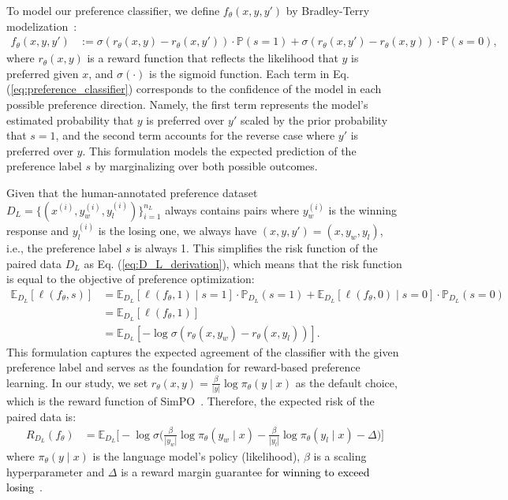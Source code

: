 \documentclass{article} %
\newcommand\fix[1]{\textcolor{black}{#1}}
\begin{document}
To model our preference classifier, we define $f_\theta(x, y, y')$ by Bradley-Terry modelization~\citep{bradley1952rank,rafailov2024direct,meng2024simposimplepreferenceoptimization}:
\begin{align}
\label{eq:preference_classifier}
    f_\theta(x, y, y') &:= \sigma(r_\theta(x, y) - r_\theta(x, y')) \cdot \mathbb{P}(s = 1) + \sigma(r_\theta(x, y') - r_\theta(x, y)) \cdot \mathbb{P}(s = 0),
\end{align}
where $r_\theta(x,y)$ is a reward function that reflects the likelihood that $y$ is preferred given $x$, and $\sigma(\cdot)$ is the sigmoid function. Each term in Eq. (\ref{eq:preference_classifier}) corresponds to the confidence of the model in each possible preference direction. Namely, the first term represents the model's estimated probability that $y$ is preferred over $y'$ scaled by the prior probability that $s = 1$, and the second term accounts for the reverse case where $y'$ is preferred over $y$. This formulation models the expected prediction of the preference label $s$ by marginalizing over both possible outcomes.

Given that the human-annotated preference dataset $D_L = \{(x^{(i)}, y^{(i)}_w, y^{(i)}_l)\}_{i=1}^{n_L}$ always contains pairs where $y^{(i)}_w$ is the winning response and $y^{(i)}_l$ is the losing one, we always have $(x,y,y')=(x,y_w,y_l)$, i.e., the preference label $s$ is always 1. This simplifies the risk function of the paired data $D_L$ as Eq. (\ref{eq:D_L_derivation}), which means that the risk function is equal to the objective of preference optimization:
\begin{align}
\label{eq:D_L_derivation}
     \mathbb{E}_{D_L}[\ell(f_\theta,s)] &= \mathbb{E}_{D_L}[\ell(f_\theta,1) \mid s=1] \cdot \mathbb{P}_{D_L}(s=1) \nonumber + \mathbb{E}_{D_L}[\ell(f_\theta,0) \mid s=0] \cdot \mathbb{P}_{D_L}(s=0) \nonumber \\ &= \mathbb{E}_{D_L}[\ell(f_\theta,1)] \nonumber  \\ &= \mathbb{E}_{D_L}[-\log\sigma(r_\theta(x,y_w)-r_\theta(x,y_l))].
\end{align}
This formulation captures the expected agreement of the classifier with the given preference label and serves as the foundation for reward-based preference learning. In our study, we set $r_\theta(x,y)=\frac{\beta}{|y|} \log \pi_\theta(y \mid x)$ as the default choice, which is the reward function of SimPO~\citep{meng2024simposimplepreferenceoptimization}. Therefore, the expected risk of the paired data is:
\begin{align}
\label{eq:D_L}
    R_{D_L}(f_\theta) 
    &= \mathbb{E}_{D_L}\Bigg[-\log\sigma\Bigg(
        \frac{\beta}{|y_w|} \log \pi_\theta(y_w \mid x) - \frac{\beta}{|y_l|} \log \pi_\theta(y_l \mid x) - \Delta \Bigg)\Bigg]
\end{align}
where $\pi_\theta(y \mid x)$ is the language model's policy (likelihood), $\beta$ is a scaling hyperparameter and $\Delta$ is a reward margin guarantee \fix{for winning to exceed losing}~\citep{firth2005bradley, meng2024simposimplepreferenceoptimization}.
\end{document}
